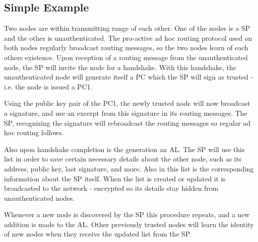 \subsection{Simple Example}
Two nodes are within transmitting range of each other. One of the nodes is a
\ac{SP} and the other is unauthenticated. The pro-active ad hoc routing protocol
used on both nodes regularly broadcast routing messages, so the two nodes learn
of each others existence. Upon reception of a routing message from the
unauthenticated node, the \ac{SP} will invite the node for a handshake. With
this handshake, the unauthenticated node will generate itself a \ac{PC} which
the \ac{SP} will sign as trusted - i.e. the node is issued a \ac{PC1}.

Using the public key pair of the \ac{PC1}, the newly trusted node will now
broadcast a signature, and use an excerpt from this signature in its routing
messages. The \ac{SP}, recognizing the signature will rebroadcast the routing
messages so regular ad hoc routing follows.

Also upon handshake completion is the generation an \ac{AL}. The \ac{SP} will
use this list in order to save certain necessary details about the other node,
such as its address, public key, last signature, and more. Also in this list is
the corresponding information about the \ac{SP} itself. When the list is created
or updated it is broadcasted to the network - encrypted so its details stay
hidden from unauthenticated nodes.

Whenever a new node is discovered by the \ac{SP} this procedure repeats, and a
new addition is made to the \ac{AL}. Other previously trusted nodes will learn
the identity of new nodes when they receive the updated list from the \ac{SP}.
